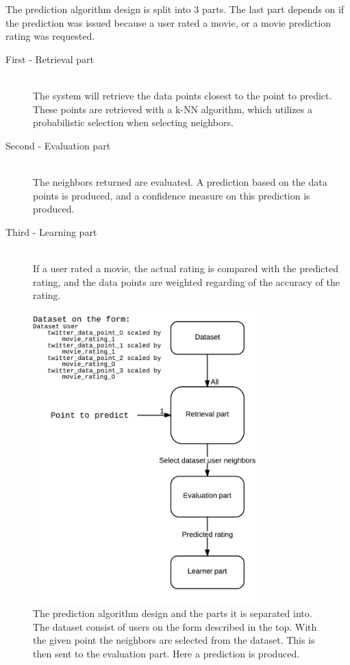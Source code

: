 The prediction algorithm design is split into 3 parts. The last part depends on if the prediction was issued because a user rated a movie, or a movie prediction rating was requested.

\begin{description}
    \item[First - Retrieval part] \hfill \\
    The system will retrieve the data points closest to the point to predict. These points are retrieved with a k-NN algorithm, which utilizes a probabilistic selection when selecting neighbors.

    \item[Second - Evaluation part] \hfill \\
    The neighbors returned are evaluated. A prediction based on the data points is produced, and a confidence measure on this prediction is produced.

    \item[Third - Learning part] \hfill \\
    If a user rated a movie, the actual rating is compared with the predicted rating, and the data points are weighted regarding of the accuracy of the rating.
\end{description}

\begin{figure}[H]
\centerline{\includegraphics[width=3.5in]{image/pred-alg.png}}
\caption[Prediction algorithm]{The prediction algorithm design and the parts it is separated into. The dataset consist of users on the form described in the top. With the given point the neighbors are selected from the dataset. This is then sent to the evaluation part. Here a prediction is produced.}
\label{figure:pred-alg}
\end{figure}
